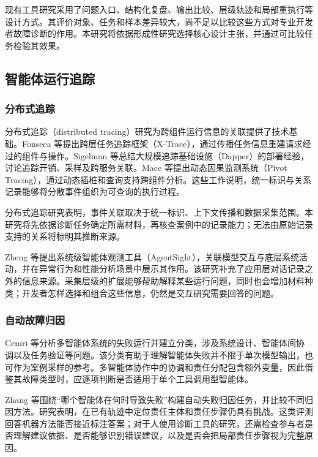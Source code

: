 现有工具研究采用了问题入口、结构化复盘、输出比较、层级轨迹和局部重执行等设计方式。其评价对象、任务和样本差异较大，尚不足以比较这些方式对专业开发者故障诊断的作用。本研究将依据形成性研究选择核心设计主张，并通过可比较任务检验其效果。

\subsection{智能体运行追踪}

\subsubsection{分布式追踪}

分布式追踪（distributed tracing）研究为跨组件运行信息的关联提供了技术基础。Fonseca 等\cite{ref30}提出跨层任务追踪框架（X-Trace），通过传播任务信息重建请求经过的组件与操作。Sigelman 等\cite{ref32}总结大规模追踪基础设施（Dapper）的部署经验，讨论追踪开销、采样及跨服务关联。Mace 等\cite{ref31}提出动态因果监测系统（Pivot Tracing），通过动态插桩和查询支持跨组件分析。这些工作说明，统一标识与关系记录能够将分散事件组织为可查询的执行过程。

分布式追踪研究表明，事件关联取决于统一标识、上下文传播和数据采集范围。本研究将先依据诊断任务确定所需材料，再核查案例中的记录能力；无法由原始记录支持的关系将标明其推断来源。

Zheng 等\cite{ref19}提出系统级智能体观测工具（AgentSight），关联模型交互与底层系统活动，并在异常行为和性能分析场景中展示其作用。该研究补充了应用层对话记录之外的信息来源。采集层级的扩展能够帮助解释某些运行问题，同时也会增加材料种类；开发者怎样选择和组合这些信息，仍然是交互研究需要回答的问题。

\subsubsection{自动故障归因}

Cemri 等\cite{cemri2025mast}分析多智能体系统的失败运行并建立分类，涉及系统设计、智能体间协调以及任务验证等问题。该分类有助于理解智能体失败并不限于单次模型输出，也可作为案例采样的参考。多智能体协作中的协调和责任分配包含额外变量，因此借鉴其故障类型时，应逐项判断是否适用于单个工具调用型智能体。

Zhang 等\cite{ref03}围绕“哪个智能体在何时导致失败”构建自动失败归因任务，并比较不同归因方法。研究表明，在已有轨迹中定位责任主体和责任步骤仍具有挑战。这类评测回答机器方法能否接近标注答案；对于人使用诊断工具的研究，还需检查参与者是否理解建议依据、是否能够识别错误建议，以及是否会把局部责任步骤视为完整原因。

